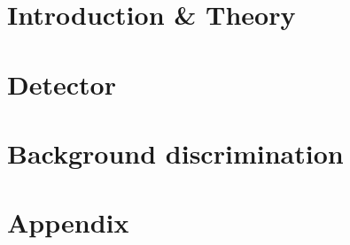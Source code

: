 \documentclass[ twoside,openright,titlepage,numbers=noenddot,%
                headinclude,footinclude,cleardoublepage=empty,abstract=on,
                BCOR=5mm,paper=a4,fontsize=11pt
                ]{scrreprt}
\begin{document}
\frenchspacing
\raggedbottom
{} %
\pagestyle{plain}

%


\cleardoublepage
\cleardoublepage
\cleardoublepage
\cleardoublepage
\cleardoublepage

\cleardoublepage
\pagestyle{scrheadings}

\cleardoublepage
\part{Introduction \& Theory}\label{pt:intro}


\cleardoublepage
{}





\part{Detector}\label{pt:detector}





\part{Background discrimination}\label{pt:approaches}



\appendix
\cleardoublepage
\part{Appendix}



\cleardoublepage
\end{document}
